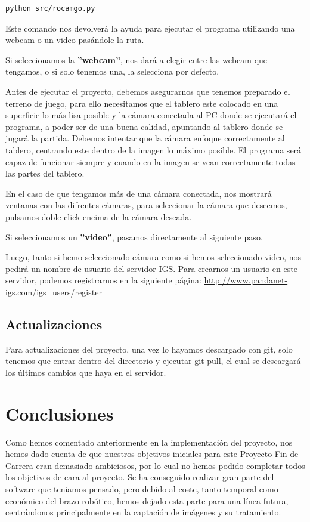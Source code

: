 \documentclass[12pt,a4papert,woside,openright,titlepage,final]{book}
\begin{document}
\begin{verbatim}
python src/rocamgo.py
\end{verbatim}

Este comando nos devolverá la ayuda para ejecutar el programa utilizando una
webcam o un video pasándole la ruta.

Si seleccionamos la \textbf{''webcam''}, nos dará a elegir entre las webcam que tengamos, o
si solo tenemos una, la selecciona por defecto.

Antes de ejecutar el proyecto, debemos asegurarnos que tenemos preparado el
terreno de juego, para ello necesitamos que el tablero este colocado en una
superficie lo más lisa posible y la cámara conectada al PC donde se ejecutará
el programa, a poder ser de una buena calidad, apuntando al tablero donde se
jugará la partida.  Debemos intentar que la cámara enfoque correctamente al
tablero, centrando este dentro de la imagen lo máximo posible. El programa será
capaz de funcionar siempre y cuando en la imagen se vean correctamente todas
las partes del tablero.

En el caso de que tengamos más de una cámara conectada, nos mostrará ventanas
con las difrentes cámaras, para seleccionar la cámara que deseemos, pulsamos
doble click encima de la cámara deseada.

Si seleccionamos un \textbf{''video''}, pasamos directamente al siguiente paso. 

Luego, tanto si hemo seleccionado cámara como si hemos seleccionado video, nos
pedirá un nombre de usuario del servidor IGS.  Para crearnos un usuario en este
servidor, podemos registrarnos en la siguiente página:
\url{http://www.pandanet-igs.com/igs_users/register}


\section{Actualizaciones}

Para actualizaciones del proyecto, una vez lo hayamos descargado con git, solo
tenemos que entrar dentro del directorio y ejecutar git pull, el cual se
descargará los últimos cambios que haya en el servidor. 


\chapter{Conclusiones}

Como hemos comentado anteriormente en la implementación del proyecto, nos hemos
dado cuenta de que nuestros objetivos iniciales para este Proyecto Fin de
Carrera eran demasiado ambiciosos, por lo cual no hemos podido completar todos
los objetivos de cara al proyecto. Se ha conseguido realizar gran parte del
software que teniamos pensado, pero debido al coste, tanto temporal como
económico del brazo robótico, hemos dejado esta parte para una línea futura,
centrándonos principalmente en la captación de imágenes y su tratamiento.
\end{document}

